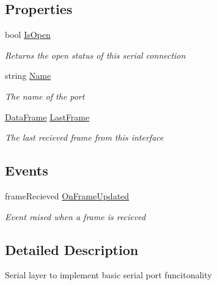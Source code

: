 \subsection*{Properties}
\begin{DoxyCompactItemize}
\item 
bool \hyperlink{class_accumulator_monitor_m017_1_1_backend_1_1_serial_interface_a499984b32652d6db5cd38f813e6d1092}{Is\+Open}
\begin{DoxyCompactList}\small\item\em Returns the open status of this serial connection \end{DoxyCompactList}\item 
string \hyperlink{class_accumulator_monitor_m017_1_1_backend_1_1_serial_interface_aacec26c3a47343c18670be22ab147cea}{Name}
\begin{DoxyCompactList}\small\item\em The name of the port \end{DoxyCompactList}\item 
\hyperlink{class_accumulator_monitor_m017_1_1_backend_1_1_data_frame}{Data\+Frame} \hyperlink{class_accumulator_monitor_m017_1_1_backend_1_1_serial_interface_afda341a3c146ca43b4b88bcf00130886}{Last\+Frame}
\begin{DoxyCompactList}\small\item\em The last recieved frame from this interface \end{DoxyCompactList}\end{DoxyCompactItemize}
\subsection*{Events}
\begin{DoxyCompactItemize}
\item 
frame\+Recieved \hyperlink{class_accumulator_monitor_m017_1_1_backend_1_1_serial_interface_aa1509130b84ccf49a834438eb9498bdf}{On\+Frame\+Updated}
\begin{DoxyCompactList}\small\item\em Event raised when a frame is recieved \end{DoxyCompactList}\end{DoxyCompactItemize}


\subsection{Detailed Description}
Serial layer to implement basic serial port funcitonality 



